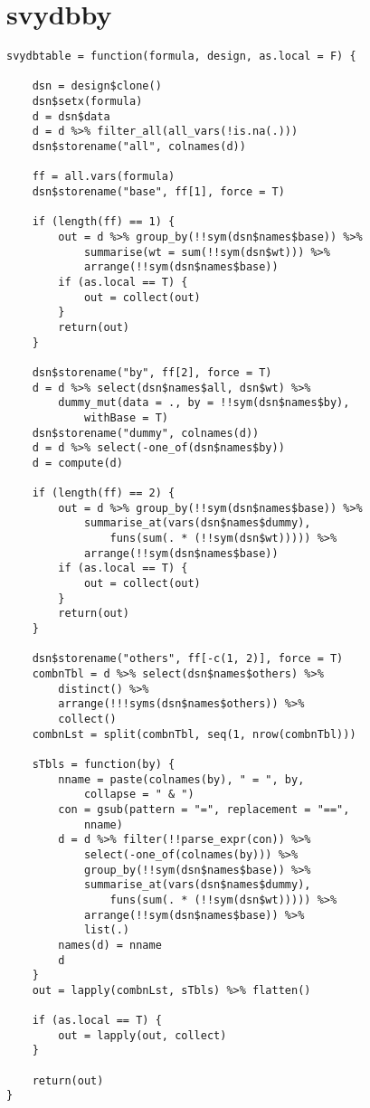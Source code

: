 \section{svydbby}

\begin{lstlisting}
svydbtable = function(formula, design, as.local = F) {
    
    dsn = design$clone()
    dsn$setx(formula)
    d = dsn$data
    d = d %>% filter_all(all_vars(!is.na(.)))
    dsn$storename("all", colnames(d))
    
    ff = all.vars(formula)
    dsn$storename("base", ff[1], force = T)
    
    if (length(ff) == 1) {
        out = d %>% group_by(!!sym(dsn$names$base)) %>% 
            summarise(wt = sum(!!sym(dsn$wt))) %>% 
            arrange(!!sym(dsn$names$base))
        if (as.local == T) {
            out = collect(out)
        }
        return(out)
    }
    
    dsn$storename("by", ff[2], force = T)
    d = d %>% select(dsn$names$all, dsn$wt) %>% 
        dummy_mut(data = ., by = !!sym(dsn$names$by), 
            withBase = T)
    dsn$storename("dummy", colnames(d))
    d = d %>% select(-one_of(dsn$names$by))
    d = compute(d)
    
    if (length(ff) == 2) {
        out = d %>% group_by(!!sym(dsn$names$base)) %>% 
            summarise_at(vars(dsn$names$dummy), 
                funs(sum(. * (!!sym(dsn$wt))))) %>% 
            arrange(!!sym(dsn$names$base))
        if (as.local == T) {
            out = collect(out)
        }
        return(out)
    }
    
    dsn$storename("others", ff[-c(1, 2)], force = T)
    combnTbl = d %>% select(dsn$names$others) %>% 
        distinct() %>% 
        arrange(!!!syms(dsn$names$others)) %>% 
        collect()
    combnLst = split(combnTbl, seq(1, nrow(combnTbl)))
    
    sTbls = function(by) {
        nname = paste(colnames(by), " = ", by, 
            collapse = " & ")
        con = gsub(pattern = "=", replacement = "==", 
            nname)
        d = d %>% filter(!!parse_expr(con)) %>% 
            select(-one_of(colnames(by))) %>% 
            group_by(!!sym(dsn$names$base)) %>% 
            summarise_at(vars(dsn$names$dummy), 
                funs(sum(. * (!!sym(dsn$wt))))) %>% 
            arrange(!!sym(dsn$names$base)) %>% 
            list(.)
        names(d) = nname
        d
    }
    out = lapply(combnLst, sTbls) %>% flatten()
    
    if (as.local == T) {
        out = lapply(out, collect)
    }
    
    return(out)
}
\end{lstlisting}

